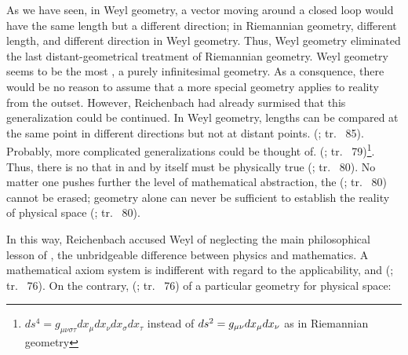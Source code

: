 \documentclass[final]{article}
\newcommand{\WG}{Weyl geometry\xspace}
\newcommand{\rhp}[2]{(\cite[#1]{Reichenbach1920a}; tr.\ \citeyear{Reichenbach1969} #2)\xspace}
\begin{document}
As we have seen, in \WG, a vector moving around a closed loop would have the same length but a different direction; in Riemannian geometry, different length, and different direction in \WG. Thus, \WG eliminated the last distant-geometrical treatment of Riemannian geometry. \WG seems to be the most , a purely infinitesimal geometry. As a consquence, there would be no reason to assume that a more special geometry applies to reality from the outset. However, Reichenbach had already surmised that this generalization could be continued. In \WG, lengths can be compared at the same point in different directions but not at distant points.  \rhp{76}{85}. Probably, more complicated generalizations could be thought of.  \rhp{76}{79}\footnote{$d s^{4}=g_{\mu \nu \sigma \tau} d x_{\mu} d x_{\nu} d x_{\sigma} d x_{\tau}$ instead of $d s^{2}=g_{\mu\nu} d x_{\mu} d x_{\nu}$ as in Riemannian geometry}. Thus, there is no  that in and by itself must be physically true \rhp{76}{80}. No matter one pushes further the level of mathematical abstraction, the  \rhp{76}{80} cannot be erased; geometry alone can never be sufficient to establish the reality of physical space \rhp{76}{80}. 

In this way, Reichenbach accused Weyl of neglecting the main philosophical lesson of \gr, the unbridgeable difference between physics and mathematics. A mathematical axiom system is indifferent with regard to the applicability, and  \rhp{73}{76}. On the contrary,  \rhp{73}{76} of a particular geometry for physical space:
\end{document}
